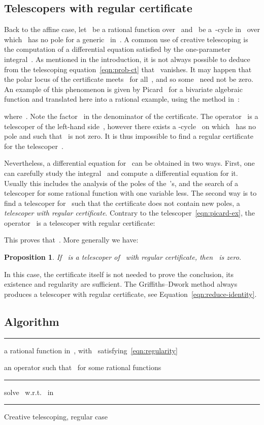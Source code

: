 \documentclass{sig-alternate}
\newtheorem{prop}[thm]{Proposition}
\newenvironment{algoenv}[3][\linewidth]{
\begin{minipage}{#1}\flushleft
\rule{\textwidth}{.08em}\vspace{-\baselineskip}\smallskip
\begin{description}[noitemsep]
\item[\rlap{Input}\phantom{Output}] #2
\item[Output] #3
\end{description}
\vspace{-\baselineskip}
\rule{\textwidth}{.05em}
\begin{algorithmic}
}{\end{algorithmic}
\vspace{-.5\baselineskip}
\rule{\textwidth}{.08em}
\end{minipage}}
\newcommand{\tCreatTel}{\textsc{Telesc}}
\begin{document}
\subsection{Telescopers with regular certificate}\label{sec:regular-certificate}


\noindent Back to the affine case, let~ be a rational function over~ and~ be a~-cycle in~ over which~ has no pole for a generic~ in~. A common use of creative telescoping is the computation of a differential equation satisfied by the one-parameter integral~.
As mentioned in the introduction, it is not always possible to deduce from the telescoping equation~\eqref{eqn:prob-ct}
that~ vanishes. It may happen that the polar locus of the certificate meets~ for all~, and so some~ need not be zero.
An example of this phenomenon is given by Picard~\cite{Pic99} for a bivariate algebraic function
and translated here into a rational example, using the method in~\cite[Lemma 4]{CheKauSin12}:

where~.
Note the factor~ in the denominator of the certificate.
The operator~ is a telescoper of the left-hand side~, however
there exists a -cycle~ on which~ has no pole and such that~ is not zero. 
It is thus impossible to find a regular certificate for the telescoper~.

Nevertheless, a differential equation for~ can be obtained in two ways.
First, one can carefully study the integral~ and compute a differential equation for it.
Usually this includes the analysis of the poles of the~'s, and the search of a telescoper for some rational function with one variable less.
The second way is to find a telescoper for~ such that the certificate does not contain new poles, a \emph{telescoper with regular certificate}.
Contrary to the telescoper~\eqref{eqn:picard-ex}, the operator~ is a telescoper with regular certificate:

This proves that~. More generally we have:
\begin{prop}
  If~ is a telescoper of~ with regular certificate, then~ is zero.
\end{prop}
In this case, the certificate itself is not needed to prove the conclusion, its existence and regularity are sufficient. The Griffiths--Dwork method always produces a telescoper with regular certificate, see Equation~\eqref{eqn:reduce-identity}.


\subsection{Algorithm}\label{sec:ct-algo}
\begin{algo}
\centering
\begin{algoenv}{
     a rational function in~, with~ satisfying~\eqref{eqn:regularity}
  }{ an operator such that~ for some rational functions~}
  \Procedure{\tCreatTel}{}
    \State  
\State 
    \Loop
    \If{}
      \State solve~ w.r.t.~ in~
      \State \Return 
    \Else
      \State 
      \State 
    \EndIf
    \EndLoop
  \EndProcedure
\end{algoenv}
\caption{Creative telescoping, regular case}
\label{algo:ct}
\end{algo}
\end{document}
